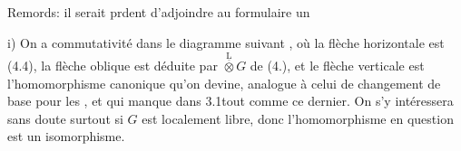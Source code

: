 Remords: il serait prdent d'adjoindre au formulaire un

 i) On a commutativité dans le diagramme suivant
,
où la flèche horizontale est (4.4), la flèche oblique est déduite par $\overset{\underline{\mathrm{L}}}{\otimes}G$ de (4.), et le flèche verticale est l'homomorphisme canonique qu'on devine, analogue à celui de changement de base pour les \handwritten{$!$}, et qui manque dans 3.1\handwritten{(}tout comme ce dernier\handwritten{)}. On s'y intéressera sans doute surtout si $G$ est localement libre, donc l'homomorphisme en question est un isomorphisme.
